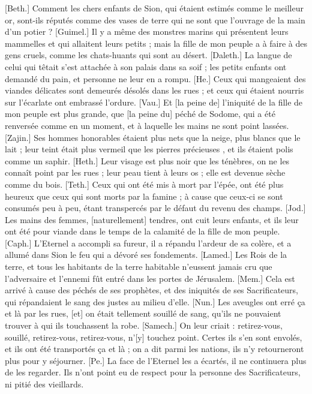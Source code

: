 \begin{multicols}{2}
[Beth.] Comment les chers enfants de Sion, qui étaient estimés comme le meilleur or, sont-ils réputés comme des vases de terre qui ne sont que l’ouvrage de la main d’un potier ?
[Guimel.] Il y a même des monstres marins qui présentent leurs mammelles et qui allaitent leurs petits ; mais la fille de mon peuple a à faire à des gens cruels, comme les chats-huants qui sont au désert.
[Daleth.] La langue de celui qui têtait s’est attachée à son palais dans sa soif ; les petits enfants ont demandé du pain, et personne ne leur en a rompu.
[He.] Ceux qui mangeaient des viandes délicates sont demeurés désolés dans les rues ; et ceux qui étaient nourris sur l’écarlate ont embrassé l’ordure.
[Vau.] Et [la peine de] l’iniquité de la fille de mon peuple est plus grande, que [la peine du] péché de Sodome, qui a été renversée comme en un moment, et à laquelle les mains ne sont point lassées.
[Zajin.] Ses hommes honorables étaient plus nets que la neige, plus blancs que le lait ; leur teint était plus vermeil que les pierres précieuses , et ils étaient polis comme un saphir.
[Heth.] Leur visage est plus noir que les ténèbres, on ne les connaît point par les rues ; leur peau tient à leurs os ; elle est devenue sèche comme du bois.
[Teth.] Ceux qui ont été mis à mort par l’épée, ont été plus heureux que ceux qui sont morts par la famine ; à cause que ceux-ci se sont consumés peu à peu, étant transpercés par le défaut du revenu des champs.
[Jod.] Les mains des femmes, [naturellement] tendres, ont cuit leurs enfants, et ils leur ont été pour viande dans le temps de la calamité de la fille de mon peuple.
[Caph.] L’Eternel a accompli sa fureur, il a répandu l’ardeur de sa colère, et a allumé dans Sion le feu qui a dévoré ses fondements.
[Lamed.] Les Rois de la terre, et tous les habitants de la terre habitable n’eussent jamais cru que l’adversaire et l’ennemi fût entré dans les portes de Jérusalem.
[Mem.] Cela est arrivé à cause des péchés de ses prophètes, et des iniquités de ses Sacrificateurs, qui répandaient le sang des justes au milieu d’elle.
[Nun.] Les aveugles ont erré ça et là par les rues, [et] on était tellement souillé de sang, qu’ils ne pouvaient trouver à qui ils touchassent la robe.
[Samech.] On leur criait : retirez-vous, souillé, retirez-vous, retirez-vous, n’[y] touchez point. Certes ils s’en sont envolés, et ils ont été transportés ça et là ; on a dit parmi les nations, ils n’y retourneront plus pour y séjourner.
[Pe.] La face de l’Eternel les a écartés, il ne continuera plus de les regarder. Ils n’ont point eu de respect pour la personne des Sacrificateurs, ni pitié des vieillards.

\end{multicols}
